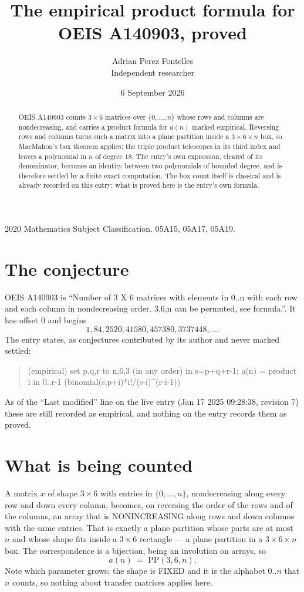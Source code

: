 \documentclass[11pt,a4paper]{article}
\title{The empirical product formula for OEIS A140903, proved}
\author{Adrian Perez Fontelles\\ \small Independent researcher}
\date{6 September 2026}
\theoremstyle{plain}
\theoremstyle{definition}
\begin{document}
\maketitle

\begin{abstract}
OEIS A140903 counts $3\times6$ matrices over $\{0,\dots,n\}$ whose rows and columns are
nondecreasing, and carries a product formula for $a(n)$ marked empirical. Reversing rows and
columns turns such a matrix into a plane partition inside a $3\times6\times n$ box, so
MacMahon's box theorem applies; the triple product telescopes in its third index and leaves a
polynomial in $n$ of degree $18$. The entry's own expression, cleared of its denominator,
becomes an identity between two polynomials of bounded degree, and is therefore settled by a
finite exact computation. The box count itself is classical and is already recorded on this
entry; what is proved here is the entry's own formula.
\end{abstract}

\noindent\small 2020 Mathematics Subject Classification. 05A15, 05A17, 05A19.\normalsize

\section{The conjecture}

OEIS A140903 is ``Number of 3 X 6 matrices with elements in 0..n with each row and each column in nondecreasing order. 3,6,n can be permuted, see formula.''. It has offset $0$ and begins
\[
1, 84, 2520, 41580, 457380, 3737448,\ \dots
\]
The entry states, as conjectures contributed by its author and never marked settled:
\begin{quote}
(empirical) set p,q,r to n,6,3 (in any order) in s=p+q+r-1; a(n) = product {i in 0..r-1} (binomial(s,p+i)*i!/(s-i)\^{}(r-i-1))

\end{quote}
As of the ``Last modified'' line on the live entry (Jan 17 2025 09:28:38, revision 7) these are still
recorded as empirical, and nothing on the entry records them as proved.

\section{What is being counted}

A matrix $x$ of shape $3\times6$ with entries in $\{0,\dots,n\}$, nondecreasing along
every row and down every column, becomes, on reversing the order of the rows and of the
columns, an array that is NONINCREASING along rows and down columns with the same entries. That
is exactly a plane partition whose parts are at most $n$ and whose shape fits inside a
$3\times6$ rectangle --- a plane partition in a $3\times6\times n$ box. The
correspondence is a bijection, being an involution on arrays, so
\[
a(n)\;=\;\mathrm{PP}(3,6,n).
\]
Note which parameter grows: the shape is FIXED and it is the alphabet $0..n$ that $n$ counts,
so nothing about transfer matrices applies here.
\end{document}
